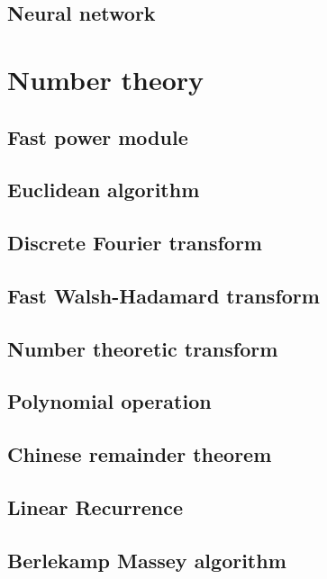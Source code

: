 \documentclass[titlepage, a4paper,10pt]{article}
\begin{document}
\begin{multicols}{2}
\begin{spacing}{0.6}
{			\subsection{Neural network}
				
		\section{Number theory}
			\subsection{Fast power module}
				
			\subsection{Euclidean algorithm}
				
			\subsection{Discrete Fourier transform}
				
			\subsection{Fast Walsh-Hadamard transform}
				
			\subsection{Number theoretic transform}
				
			\subsection{Polynomial operation}
				
			\subsection{Chinese remainder theorem}
				
			\subsection{Linear Recurrence}
				
			\subsection{Berlekamp Massey algorithm}
				
}
\end{spacing}
\end{multicols}
\end{document}
